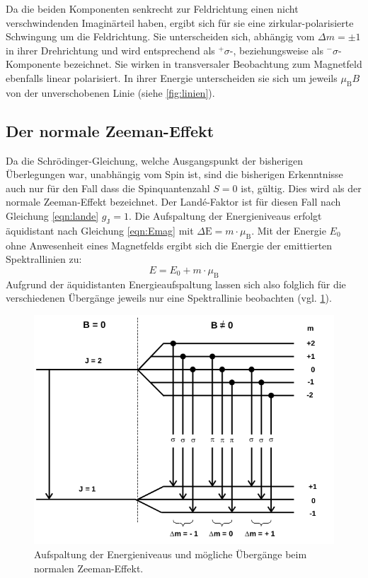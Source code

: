 Da die beiden Komponenten senkrecht zur Feldrichtung einen nicht verschwindenden Imaginärteil haben, ergibt sich für sie eine zirkular-polarisierte Schwingung um die Feldrichtung. Sie unterscheiden sich, abhängig vom $\Delta m=\pm 1$ in ihrer Drehrichtung und wird entsprechend als $^{+}\sigma$-, beziehungsweise als $^{-}\sigma$-Komponente bezeichnet.
Sie wirken in transversaler Beobachtung zum Magnetfeld ebenfalls linear polarisiert.
In ihrer Energie unterscheiden sie sich um jeweils $\mu_{\mathrm{B}}B$ von der unverschobenen Linie (siehe \ref{fig:linien}).

\subsection{Der normale Zeeman-Effekt}
Da die Schrödinger-Gleichung, welche Ausgangspunkt der bisherigen Überlegungen war, unabhängig vom Spin ist, sind die bisherigen Erkenntnisse auch nur für den Fall dass die Spinquantenzahl $S=0$ ist, gültig.
Dies wird als der normale Zeeman-Effekt bezeichnet. Der Landé-Faktor ist für diesen Fall nach Gleichung \eqref{eqn:lande} $g_{\mathrm{J}}=1$.
Die Aufspaltung der Energieniveaus erfolgt äquidistant nach Gleichung \eqref{eqn:Emag} mit $\Delta \mathrm{E}=m\cdot \mu_{\mathrm{B}}$.
Mit der Energie $E_0$ ohne Anwesenheit eines Magnetfelds ergibt sich die Energie der emittierten Spektrallinien zu:
\begin{equation}
  E=E_0+ m\cdot \mu_{\mathrm{B}}
\end{equation}
Aufgrund der äquidistanten Energieaufspaltung lassen sich also folglich für die verschiedenen Übergänge jeweils nur eine Spektrallinie beobachten (vgl. \ref{fig:normaler}).
\begin{figure}
  \centering
  \includegraphics[width=0.75\columnwidth]{pictures/linienaufspaltung.png}
  \caption{Aufspaltung der Energieniveaus und mögliche Übergänge beim normalen Zeeman-Effekt.\cite{Anleitung}}
  \label{fig:normaler}
\end{figure}
